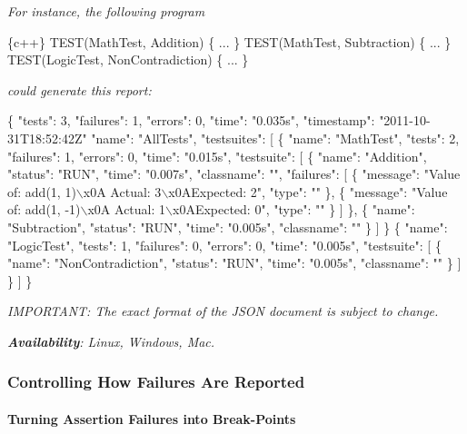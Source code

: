 {\itshape For instance, the following program}

{\itshape 
\begin{DoxyCode}
\{c++\}
TEST(MathTest, Addition) \{ ... \}
TEST(MathTest, Subtraction) \{ ... \}
TEST(LogicTest, NonContradiction) \{ ... \}
\end{DoxyCode}
}

{\itshape could generate this report\+:}

{\itshape 
\begin{DoxyCode}
\{
  "tests": 3,
  "failures": 1,
  "errors": 0,
  "time": "0.035s",
  "timestamp": "2011-10-31T18:52:42Z"
  "name": "AllTests",
  "testsuites": [
    \{
      "name": "MathTest",
      "tests": 2,
      "failures": 1,
      "errors": 0,
      "time": "0.015s",
      "testsuite": [
        \{
          "name": "Addition",
          "status": "RUN",
          "time": "0.007s",
          "classname": "",
          "failures": [
            \{
              "message": "Value of: add(1, 1)\(\backslash\)x0A  Actual: 3\(\backslash\)x0AExpected: 2",
              "type": ""
            \},
            \{
              "message": "Value of: add(1, -1)\(\backslash\)x0A  Actual: 1\(\backslash\)x0AExpected: 0",
              "type": ""
            \}
          ]
        \},
        \{
          "name": "Subtraction",
          "status": "RUN",
          "time": "0.005s",
          "classname": ""
        \}
      ]
    \}
    \{
      "name": "LogicTest",
      "tests": 1,
      "failures": 0,
      "errors": 0,
      "time": "0.005s",
      "testsuite": [
        \{
          "name": "NonContradiction",
          "status": "RUN",
          "time": "0.005s",
          "classname": ""
        \}
      ]
    \}
  ]
\}
\end{DoxyCode}
}

{\itshape I\+M\+P\+O\+R\+T\+A\+NT\+: The exact format of the J\+S\+ON document is subject to change.}

{\itshape {\bfseries Availability}\+: Linux, Windows, Mac.}

{\itshape \subsubsection*{Controlling How Failures Are Reported}}

{\itshape }

{\itshape \paragraph*{Turning Assertion Failures into Break-\/\+Points}}

